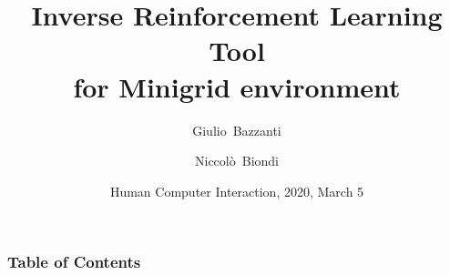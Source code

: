 \documentclass[10pt]{beamer}
\title[Inverse Reinforcement Learning Tool for Minigrid environment] %
{Inverse Reinforcement Learning Tool \\ for Minigrid environment }
\author[Giulio Bazzanti, Niccolò Biondi] %
{Giulio~Bazzanti \and Niccolò~Biondi}
\date[HCI 2020] %
{Human Computer Interaction, 2020, March 5}
\begin{document}
\frame{\titlepage}

\begin{frame}
\frametitle{Table of Contents}
\tableofcontents
\end{frame}






\end{document}
